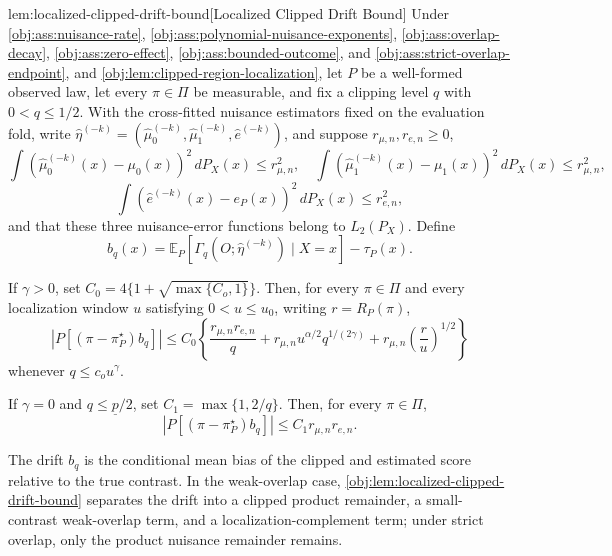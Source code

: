 \begin{lemmav}{lem:localized-clipped-drift-bound}[Localized Clipped Drift Bound]
Under \cref{obj:ass:nuisance-rate}, \cref{obj:ass:polynomial-nuisance-exponents}, \cref{obj:ass:overlap-decay}, \cref{obj:ass:zero-effect}, \cref{obj:ass:bounded-outcome}, and \cref{obj:ass:strict-overlap-endpoint}, and \cref{obj:lem:clipped-region-localization}, let \(P\) be a well-formed observed law, let every \(\pi\in\Pi\) be measurable, and fix a clipping level \(q\) with \(0<q\le 1/2\).  With the cross-fitted nuisance estimators fixed on the evaluation fold, write \(\widehat\eta^{(-k)}=(\widehat\mu_0^{(-k)},\widehat\mu_1^{(-k)},\widehat e^{(-k)})\), and suppose \(r_{\mu,n},r_{e,n}\ge0\),
\[
\int (\widehat\mu_0^{(-k)}(x)-\mu_0(x))^2\,dP_X(x)\le r_{\mu,n}^2,
\quad
\int (\widehat\mu_1^{(-k)}(x)-\mu_1(x))^2\,dP_X(x)\le r_{\mu,n}^2,
\]
\[
\int (\widehat e^{(-k)}(x)-e_P(x))^2\,dP_X(x)\le r_{e,n}^2,
\]
and that these three nuisance-error functions belong to \(L_2(P_X)\).  Define
\[
b_q(x)
=
\mathbb E_P\!\left[\Gamma_q(O;\widehat\eta^{(-k)})\mid X=x\right]
-
\tau_P(x).
\]

If \(\gamma>0\), set \(C_0=4\{1+\sqrt{\max\{C_o,1\}}\}\).  Then, for every \(\pi\in\Pi\) and every localization window \(u\) satisfying \(0<u\le u_0\), writing \(r=R_P(\pi)\),
\[
\left|P\!\left[(\pi-\pi^\star_P)b_q\right]\right|
\le
C_0\left\{
\frac{r_{\mu,n}r_{e,n}}{q}
+
r_{\mu,n}u^{\alpha/2}q^{1/(2\gamma)}
+
r_{\mu,n}\left(\frac{r}{u}\right)^{1/2}
\right\}
\]
whenever \(q\le c_o u^\gamma\).

If \(\gamma=0\) and \(q\le \underline p/2\), set \(C_1=\max\{1,2/q\}\).  Then, for every \(\pi\in\Pi\),
\[
\left|P\!\left[(\pi-\pi^\star_P)b_q\right]\right|
\le
C_1 r_{\mu,n}r_{e,n}.
\]
\end{lemmav}

The drift \(b_q\) is the conditional mean bias of the clipped and estimated score relative to the true contrast.  In the weak-overlap case, \cref{obj:lem:localized-clipped-drift-bound} separates the drift into a clipped product remainder, a small-contrast weak-overlap term, and a localization-complement term; under strict overlap, only the product nuisance remainder remains.

